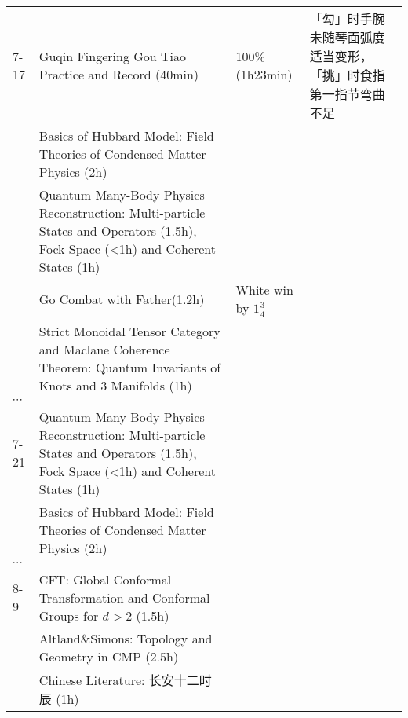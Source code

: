 \documentclass[10pt]{article}
\newcommand{\tabitem}{\textbullet\quad}
\begin{document}
\begin{longtable}{|p{2cm}|p{7cm}|p{2.5cm}|p{4.5cm}|}
	\hline
	7-17 & \tabitem Guqin Fingering Gou Tiao Practice and Record (40min) & 100\% (1h23min) & \tabitem 「勾」时手腕未随琴面弧度适当变形，「挑」时食指第一指节弯曲不足\\
	\quad & \tabitem Basics of Hubbard Model: Field Theories of Condensed Matter Physics (2h) & & \\
	& \tabitem Quantum Many-Body Physics Reconstruction: Multi-particle States and Operators (1.5h), Fock Space (<1h) and Coherent States (1h)  & & \\
	& \tabitem Go Combat with Father(1.2h) & White win by $1\frac{3}{4}$& \\
	& \tabitem Strict Monoidal Tensor Category and Maclane Coherence Theorem: Quantum Invariants of Knots and 3 Manifolds (1h) & & \\
	\hline
	$\cdots$ & & & \\
	\hline
	7-21 & \tabitem Quantum Many-Body Physics Reconstruction: Multi-particle States and Operators (1.5h), Fock Space (<1h) and Coherent States (1h)  & & \\
	\quad & \tabitem  Basics of Hubbard Model: Field Theories of Condensed Matter Physics (2h) & & \\
	\hline
	$\cdots$ & & & \\
	\hline
	8-9 & \tabitem CFT: Global Conformal Transformation and Conformal Groups for $d>2$ (1.5h) & & \\
	& \tabitem Altland\&Simons: Topology and Geometry in CMP (2.5h) & & \\
	& \tabitem Chinese Literature: 长安十二时辰 (1h) & & 
 
\end{longtable}
\end{document}
